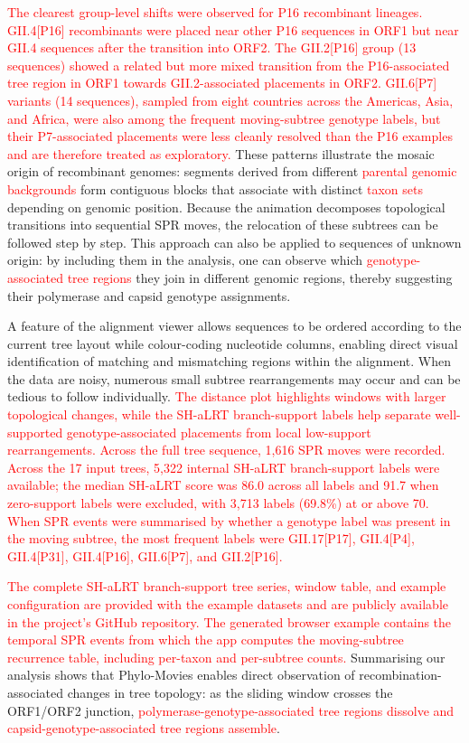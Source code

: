 \textcolor{red}{The clearest group-level shifts were observed for P16 recombinant lineages. GII.4[P16] recombinants were placed near other P16 sequences in ORF1 but near GII.4 sequences after the transition into ORF2. The GII.2[P16] group (13 sequences) showed a related but more mixed transition from the P16-associated tree region in ORF1 towards GII.2-associated placements in ORF2. GII.6[P7] variants (14 sequences), sampled from eight countries across the Americas, Asia, and Africa, were also among the frequent moving-subtree genotype labels, but their P7-associated placements were less cleanly resolved than the P16 examples and are therefore treated as exploratory.} These patterns illustrate the mosaic origin of recombinant genomes: segments derived from different \textcolor{red}{parental genomic backgrounds} form contiguous blocks that associate with distinct \textcolor{red}{taxon sets} depending on genomic position. Because the animation decomposes topological transitions into sequential SPR moves, the relocation of these subtrees can be followed step by step. This approach can also be applied to sequences of unknown origin: by including them in the analysis, one can observe which \textcolor{red}{genotype-associated tree regions} they join in different genomic regions, thereby suggesting their polymerase and capsid genotype assignments.

A feature of the alignment viewer allows sequences to be ordered according to the current tree layout while colour-coding nucleotide columns, enabling direct visual identification of matching and mismatching regions within the alignment. When the data are noisy, numerous small subtree rearrangements may occur and can be tedious to follow individually. \textcolor{red}{The distance plot highlights windows with larger topological changes, while the SH-aLRT branch-support labels help separate well-supported genotype-associated placements from local low-support rearrangements. Across the full tree sequence, 1{,}616 SPR moves were recorded. Across the 17 input trees, 5{,}322 internal SH-aLRT branch-support labels were available; the median SH-aLRT score was 86.0 across all labels and 91.7 when zero-support labels were excluded, with 3{,}713 labels (69.8\%) at or above 70. When SPR events were summarised by whether a genotype label was present in the moving subtree, the most frequent labels were GII.17[P17], GII.4[P4], GII.4[P31], GII.4[P16], GII.6[P7], and GII.2[P16].}

\textcolor{red}{The complete SH-aLRT branch-support tree series, window table, and example configuration are provided with the example datasets and are publicly available in the project’s GitHub repository. The generated browser example contains the temporal SPR events from which the app computes the moving-subtree recurrence table, including per-taxon and per-subtree counts.} Summarising our analysis shows that Phylo-Movies enables direct observation of recombination-associated changes in tree topology: as the sliding window crosses the ORF1/ORF2 junction, \textcolor{red}{polymerase-genotype-associated tree regions dissolve and capsid-genotype-associated tree regions assemble}.


